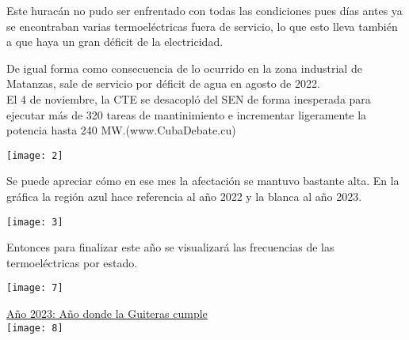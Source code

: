 \documentclass{article}
\begin{document}
\vspace{0.5cm}

Este huracán no pudo ser enfrentado con todas las condiciones pues días antes ya se encontraban varias termoeléctricas fuera de servicio, lo que esto lleva también a que haya un gran déficit de la electricidad.\\

\vspace{0.5cm}

De igual forma como consecuencia de lo ocurrido en la zona industrial de Matanzas, sale de servicio por déficit de agua en agosto de 2022.\\
El 4 de noviembre, la CTE se desacopló del SEN de forma inesperada para ejecutar más de 320 tareas de mantinimiento e incrementar ligeramente la potencia hasta 240 MW.(www.CubaDebate.cu)\\

\vspace{1cm}
\begin{center}
    \texttt{[image: 2]}\\
\end{center}

\vspace{1cm}

Se puede apreciar cómo en ese mes la afectación se mantuvo bastante alta. En la gráfica la región azul hace referencia al año 2022 y la blanca al año 2023. \\

\vspace{0.5cm}
\begin{center}
   \texttt{[image: 3]} \\
\end{center}

\vspace{0.5cm}

Entonces para finalizar este año se visualizará las frecuencias de las termoeléctricas por estado.\\

\vspace{1cm}

\begin{center}
    \texttt{[image: 7]}\\
    
    \vspace{1cm}

    \underline{Año 2023: Año donde la Guiteras cumple}\\

    \vspace{1cm}
    \texttt{[image: 8]} \\
    
\end{center}
\end{document}
